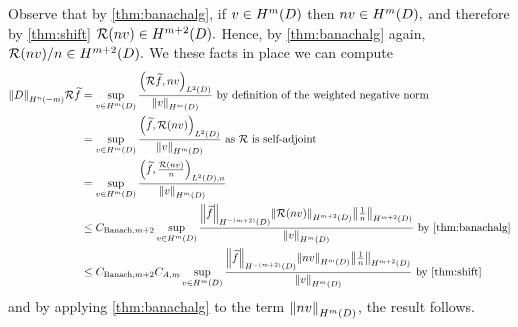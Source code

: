 Observe that by \cref{thm:banachalg}, if $v \in \HmD$ then $nv \in \HmD,$ and therefore by \cref{thm:shift} $\sdres(nv) \in \HmptD.$ Hence, by \cref{thm:banachalg} again, $\sdres(nv)/n \in \HmptD.$ We these facts in place we can compute
\begin{align*}
\NHfn{n}{-m}{D}{\sdres \ftilde} &= \sup_{v \in \HmD} \frac{\IPLtD{\sdres \ftilde}{nv}}{\NHmD{v}}\text{ by definition of the weighted negative norm}\\
& = \sup_{v \in \HmD} \frac{\IPLtD{ \ftilde}{\sdres(nv)}}{\NHmD{v}}\text{ as } \sdres \text{ is self-adjoint}\\
&= \sup_{v \in \HmD} \frac{\IPLtDn{\ftilde}{\frac{\sdres(nv)}n}}{\NHmD{v}}\\
&\leq \CBanfn{m+2}\sup_{v \in \HmD} \frac{\NHfn{-(m+2)}{D}{\ftilde}\NHfn{m+2}{D}{\sdres(nv)}\NHfn{m+2}{D}{\frac1n}}{\NHmD{v}} \text{ by \cref{thm:banachalg}}\\
&\leq \CBanfn{m+2}\CAfn{m}\sup_{v \in \HmD} \frac{\NHfn{-(m+2)}{D}{\ftilde}\NHfn{m}{D}{nv}\NHfn{m+2}{D}{\frac1n}}{\NHmD{v}} \text{ by \cref{thm:shift}}\\
\end{align*}
and by applying \cref{thm:banachalg} to the term $\NHfn{m}{D}{nv}$, the result follows.
\epf



